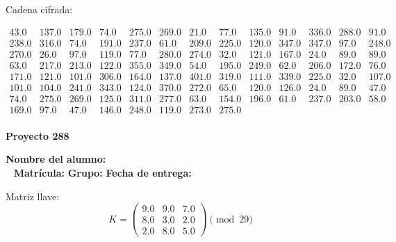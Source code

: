 \documentclass[12pt]{article}
\begin{document}
Cadena cifrada:
\begin{center}
$\begin{array}{lllllllllllll}
43.0 & 137.0 & 179.0 & 74.0 & 275.0 & 269.0 & 21.0 & 77.0 & 135.0 & 91.0 & 336.0 & 288.0 & 91.0\\
238.0 & 316.0 & 74.0 & 191.0 & 237.0 & 61.0 & 209.0 & 225.0 & 120.0 & 347.0 & 347.0 & 97.0 & 248.0\\
270.0 & 26.0 & 97.0 & 119.0 & 77.0 & 280.0 & 274.0 & 32.0 & 121.0 & 167.0 & 24.0 & 89.0 & 89.0\\
63.0 & 217.0 & 213.0 & 122.0 & 355.0 & 349.0 & 54.0 & 195.0 & 249.0 & 62.0 & 206.0 & 172.0 & 76.0\\
171.0 & 121.0 & 101.0 & 306.0 & 164.0 & 137.0 & 401.0 & 319.0 & 111.0 & 339.0 & 225.0 & 32.0 & 107.0\\
101.0 & 104.0 & 241.0 & 343.0 & 124.0 & 370.0 & 272.0 & 65.0 & 120.0 & 126.0 & 24.0 & 89.0 & 47.0\\
74.0 & 275.0 & 269.0 & 125.0 & 311.0 & 277.0 & 63.0 & 154.0 & 196.0 & 61.0 & 237.0 & 203.0 & 58.0\\
169.0 & 97.0 & 47.0 & 146.0 & 248.0 & 119.0 & 273.0 & 275.0\\
\end{array}$
\end{center}

\newpage


\textbf{Proyecto 288}

\textbf{Nombre del alumno:} \underline{\hspace{13cm}}\\\
\vspace{1cm}
\textbf{Matrícula:} \underline{\hspace{4cm}} \hspace{1cm}
\textbf{Grupo:} \underline{\hspace{2cm}}
\textbf{Fecha de entrega:} \underline{\hspace{2cm}}

\medskip

Matriz llave:
\[
K = \begin{pmatrix}
9.0 & 9.0 & 7.0\\
8.0 & 3.0 & 2.0\\
2.0 & 8.0 & 5.0
\end{pmatrix} \pmod{29}
\]
\end{document}
